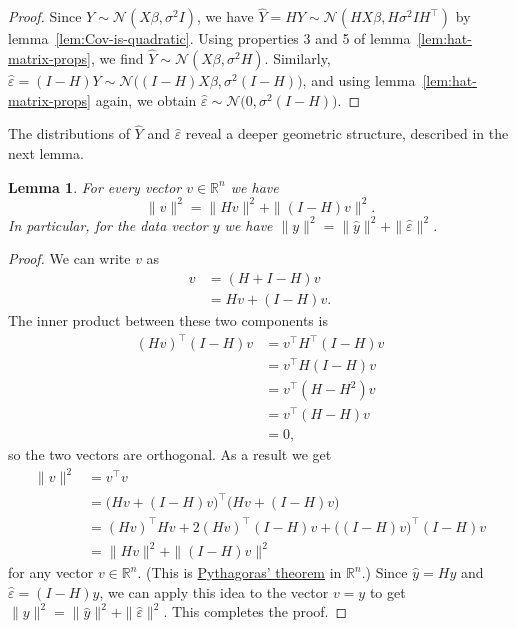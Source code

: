 \documentclass[
  a4paper,
]{article}
\newtheorem{lemma}{Lemma}[section]
\theoremstyle{definition}
\theoremstyle{definition}
\theoremstyle{definition}
\theoremstyle{definition}
\theoremstyle{remark}
\begin{document}
\begin{proof}
Since \(Y \sim \mathcal{N}(X\beta, \sigma^2 I)\), we have \(\hat Y = HY \sim \mathcal{N}(HX\beta, H\sigma^2 I H^\top)\)
by lemma~\ref{lem:Cov-is-quadratic}. Using properties 3 and 5 of
lemma~\ref{lem:hat-matrix-props}, we find \(\hat Y \sim \mathcal{N}(X\beta, \sigma^2 H)\).
Similarly, \(\hat\varepsilon= (I - H)Y \sim \mathcal{N}\bigl((I - H)X\beta, \sigma^2(I - H)\bigr)\),
and using lemma~\ref{lem:hat-matrix-props} again, we obtain
\(\hat\varepsilon\sim \mathcal{N}\bigl(0, \sigma^2(I - H)\bigr)\).
\end{proof}

The distributions of \(\hat Y\) and \(\hat\varepsilon\) reveal a deeper geometric
structure, described in the next lemma.

\begin{lemma}
For every vector \(v \in \mathbb{R}^n\) we have
\begin{equation}
  \|v\|^2
  = \|Hv\|^2 + \|(I-H)v\|^2.  \label{eq:eps-y-orth}
\end{equation}
In particular, for the data vector \(y\) we have \(\|y\|^2 = \|\hat y\|^2 + \|\hat\varepsilon\|^2\).
\end{lemma}

\begin{proof}
We can write \(v\) as
\begin{align*}
  v
  &= (H + I - H)v \\
  &= Hv + (I-H)v.
\end{align*}
The inner product between these two components is
\begin{align*}
  (Hv)^\top (I-H)v
  &= v^\top H^\top (I-H) v \\
  &= v^\top H (I-H) v \\
  &= v^\top (H-H^2) v \\
  &= v^\top (H-H) v \\
  &= 0,
\end{align*}
so the two vectors are orthogonal.
As a result we get
\begin{align*}
  \|v\|^2
  &= v^\top v \\
  &= \bigl( Hv + (I-H)v \bigr)^\top \bigl( Hv + (I-H)v \bigr) \\
  &= (Hv)^\top Hv + 2 (Hv)^\top (I-H)v + \bigl((I-H)v\bigr)^\top (I-H)v \\
  &= \| Hv \|^2 + \|(I-H)v \|^2
\end{align*}
for any vector \(v \in \mathbb{R}^n\).
(This is \href{https://en.wikipedia.org/wiki/Pythagorean_theorem}{Pythagoras' theorem} in \(\mathbb{R}^n\).)
Since \(\hat y = Hy\) and \(\hat\varepsilon= (I - H)y\), we can apply this idea to the
vector \(v = y\) to get \(\|y\|^2 = \|\hat y\|^2 + \|\hat\varepsilon\|^2\).
This completes the proof.
\end{proof}
\end{document}
